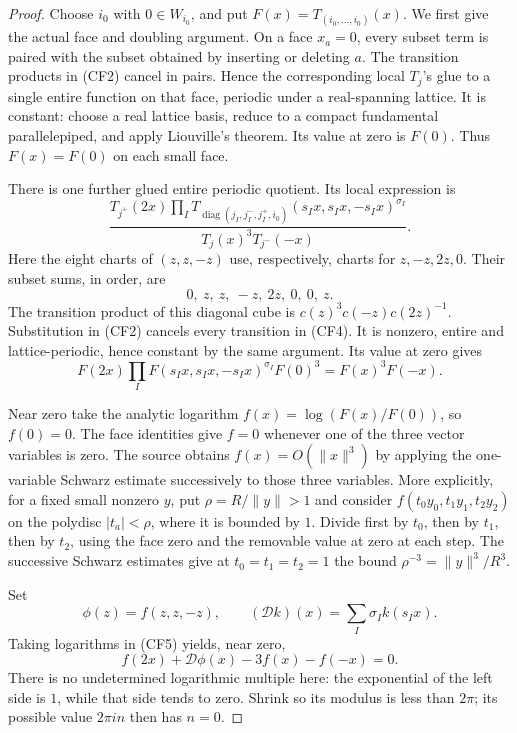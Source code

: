 \begin{proof}
Choose \(i_0\) with \(0\in W_{i_0}\), and put
\(F(x)=T_{(i_0,\ldots,i_0)}(x)\).
We first give the actual face and doubling argument.
On a face \(x_a=0\), every subset term is paired with the subset
obtained by inserting or deleting \(a\).  The transition products in
(CF2) cancel in pairs.  Hence the corresponding local \(T_j\)'s glue to
a single entire function on that face, periodic under a real-spanning
lattice.  It is constant: choose a real lattice basis, reduce to a
compact fundamental parallelepiped, and apply Liouville's theorem.
Its value at zero is \(F(0)\).  Thus \(F(x)=F(0)\) on each small face.

There is one further glued entire periodic quotient.  Its local
expression is
\[
 \frac{T_{j^+}(2x)
       \prod_I T_{\operatorname{diag}(j_I,j^-_I,j^+_I,i_0)}
                    (s_Ix,s_Ix,-s_Ix)^{\sigma_I}}
      {T_j(x)^3T_{j^-}(-x)}.                               \tag{CF4}
\]
Here the eight charts of \((z,z,-z)\) use, respectively, charts for
\(z,-z,2z,0\). Their subset sums, in order, are
\[
                    0,\ z,\ z,\ -z,\ 2z,\ 0,\ 0,\ z.
\]
The transition product of this diagonal cube is
\(c(z)^3c(-z)c(2z)^{-1}\).  Substitution in (CF2) cancels every
transition in (CF4).  It is nonzero, entire and lattice-periodic,
hence constant by the same argument.  Its value at zero gives
\[
 F(2x)\prod_I F(s_Ix,s_Ix,-s_Ix)^{\sigma_I}F(0)^3
                         =F(x)^3F(-x).                    \tag{CF5}
\]

Near zero take the analytic logarithm
\(f(x)=\log(F(x)/F(0))\), so \(f(0)=0\).
The face identities give \(f=0\) whenever one of the three vector
variables is zero.  The source obtains
\(f(x)=O(\|x\|^3)\) by applying the one-variable Schwarz estimate
successively to those three variables.  More explicitly, for a fixed
small nonzero \(y\), put \(\rho=R/\|y\|>1\) and consider
\(f(t_0y_0,t_1y_1,t_2y_2)\) on the polydisc
\(|t_a|<\rho\), where it is bounded by \(1\).
Divide first by \(t_0\), then by \(t_1\), then by \(t_2\), using
the face zero and the removable value at zero at each step.
The successive Schwarz estimates give at \(t_0=t_1=t_2=1\)
the bound \(\rho^{-3}=\|y\|^3/R^3\).

Set
\[
 \phi(z)=f(z,z,-z),\qquad
 (\mathcal Dk)(x)=\sum_I\sigma_I k(s_Ix).
\]
Taking logarithms in (CF5) yields, near zero,
\[
       f(2x)+\mathcal D\phi(x)-3f(x)-f(-x)=0.               \tag{CF6}
\]
There is no undetermined logarithmic multiple here: the exponential
of the left side is \(1\), while that side tends to zero.  Shrink so
its modulus is less than \(2\pi\); its possible value
\(2\pi i n\) then has \(n=0\).


\end{proof}
